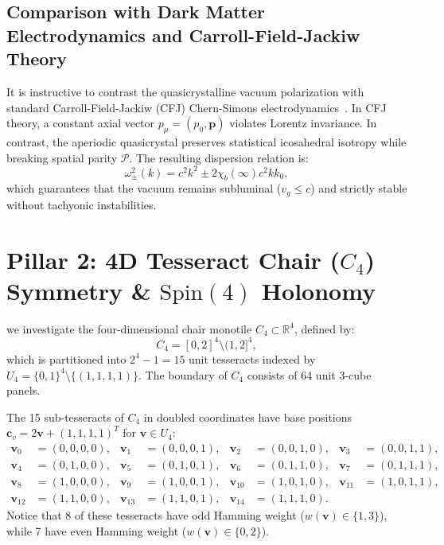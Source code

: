 \documentclass[11pt,a4paper]{article}
\theoremstyle{definition}
\newcommand{\R}{\mathbb{R}}
\newcommand{\Spin}{\mathrm{Spin}}
\begin{document}
\subsection{Comparison with Dark Matter Electrodynamics and Carroll-Field-Jackiw Theory}

It is instructive to contrast the quasicrystalline vacuum polarization with standard Carroll-Field-Jackiw (CFJ) Chern-Simons electrodynamics~\cite{MinamiKomatsu2020}. In CFJ theory, a constant axial vector $p_\mu = (p_0, \mathbf{p})$ violates Lorentz invariance. In contrast, the aperiodic quasicrystal preserves statistical icosahedral isotropy while breaking spatial parity $\mathcal{P}$. The resulting dispersion relation is:
\begin{equation}
\omega_\pm^2(k) = c^2 k^2 \pm 2\chi_b(\infty) c^2 k k_0,
\end{equation}
which guarantees that the vacuum remains subluminal ($v_g \le c$) and strictly stable without tachyonic instabilities.

\section{Pillar 2: 4D Tesseract Chair ($C_4$) Symmetry \& $\Spin(4)$ Holonomy}

we investigate the four-dimensional chair monotile $C_4 \subset \R^4$, defined by:
\begin{equation}
C_4 = [0,2]^4 \setminus (1,2]^4,
\end{equation}
which is partitioned into $2^4 - 1 = 15$ unit tesseracts indexed by $U_4 = \{0,1\}^4 \setminus \{(1,1,1,1)\}$. The boundary of $C_4$ consists of 64 unit 3-cube panels.

The 15 sub-tesseracts of $C_4$ in doubled coordinates have base positions $\mathbf{c}_v = 2\mathbf{v} + (1,1,1,1)^T$ for $\mathbf{v} \in U_4$:
\begin{align}
\mathbf{v}_0 &= (0,0,0,0), & \mathbf{v}_1 &= (0,0,0,1), & \mathbf{v}_2 &= (0,0,1,0), & \mathbf{v}_3 &= (0,0,1,1), \\
\mathbf{v}_4 &= (0,1,0,0), & \mathbf{v}_5 &= (0,1,0,1), & \mathbf{v}_6 &= (0,1,1,0), & \mathbf{v}_7 &= (0,1,1,1), \\
\mathbf{v}_8 &= (1,0,0,0), & \mathbf{v}_9 &= (1,0,0,1), & \mathbf{v}_{10} &= (1,0,1,0), & \mathbf{v}_{11} &= (1,0,1,1), \\
\mathbf{v}_{12} &= (1,1,0,0), & \mathbf{v}_{13} &= (1,1,0,1), & \mathbf{v}_{14} &= (1,1,1,0).
\end{align}
Notice that 8 of these tesseracts have odd Hamming weight ($w(\mathbf{v}) \in \{1, 3\}$), while 7 have even Hamming weight ($w(\mathbf{v}) \in \{0, 2\}$).
\end{document}
